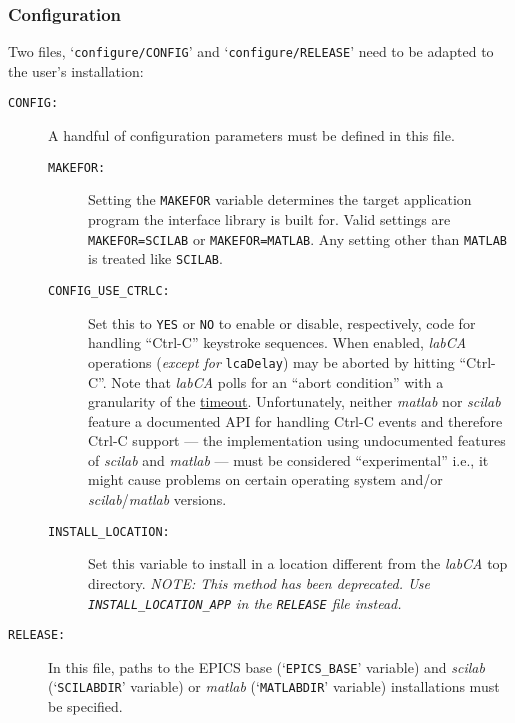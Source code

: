 \documentclass{article}
\newcommand{\sca}{\ita{labCA}}
\newcommand{\scilab}{\ita{scilab}}
\newcommand{\matlab}{\ita{matlab}}
\newcommand{\ezca}{\ita{ezca}}
\newcommand{\com}[1]{{\tt #1}}
\newcommand{\pbrkf}{\pagebreak}
\newcommand{\ita}[1]{\emph{#1}}
\renewcommand{\pbrkf}{}
\begin{document}
\pbrkf
\subsubsection{Configuration}
Two files, `\com{configure/CONFIG}' and `\com{configure/RELEASE}' need to
be adapted to the user's installation:
\begin{description}
\item[\tt CONFIG:] A handful of configuration parameters must be defined
in this file.
\begin{description}
\item[\tt MAKEFOR:] Setting the \com{MAKEFOR} variable
determines the target application program the interface library is
built for. Valid settings are \com{MAKEFOR=SCILAB} or \com{MAKEFOR=MATLAB}.
Any setting other than \com{MATLAB} is treated like \com{SCILAB}.

\item[\tt CONFIG\_USE\_CTRLC:] Set this to {\tt YES} or {\tt NO} to enable
or disable, respectively, code for handling ``Ctrl-C'' keystroke sequences.
When enabled, \sca{} operations ({\em except for} \com{lcaDelay}) may be aborted
by hitting ``Ctrl-C''.
Note that \sca{} polls for an ``abort condition'' with a granularity of the
\hyperref{\ezca{} timeout parameter}{timeout parameter (see }{)}{timeout}.
Unfortunately, neither \matlab{} nor \scilab{} feature a documented API for handling
Ctrl-C events and therefore Ctrl-C support --- the implementation using undocumented
features of \scilab{} and \matlab{} --- must be considered ``experimental''
i.e., it might cause problems on certain operating system and/or \scilab/\matlab{}
versions.

\item[\tt INSTALL\_LOCATION:] Set this variable to install in a location
different from the \sca{} top directory.
{\em NOTE: This method has been deprecated.
Use \com{INSTALL\_LOCATION\_APP} in the \com{RELEASE} file
instead.}
\end{description}
%
%
\item[\tt RELEASE:] In this file, paths to the EPICS base (`\com{EPICS\_BASE}'
variable) and \scilab{} (`\com{SCILABDIR}' variable) or \matlab{} (`\com{MATLABDIR}'
variable) installations must be specified.


\end{description}
\end{document}
